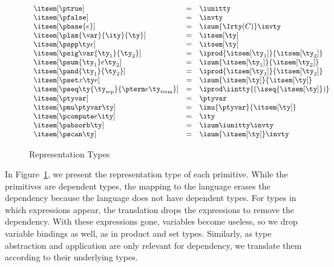 \begin{figure}
\fbox{$\itsem[\ty] = \ity$}
\[
\begin{array}{lcl} 
\itsem[\ptrue] & = & \iunitty \\
\itsem[\pfalse] & = & \invty \\
\itsem[\pbase{e}] & = & \isum {\Irty(C)} \invty   \\
\itsem[\plam{\var}{\ity}{\ty}] & = & \itsem[\ty] \\
\itsem[\papp \ty e] & = & \itsem[\ty] \\
\itsem[\psig \var {\ty_1} {\ty_2}]  & = & \iprod {\itsem[\ty_1]} {\itsem[\ty_2]}    \\
\itsem[\psum {\ty_1} e {\ty_2}]     & = & \isum {\itsem[\ty_1]} {\itsem[\ty_2]} \\
\itsem[\pand {\ty_1} {\ty_2}]  & = & \iprod {\itsem[\ty_1]}{\itsem[\ty_2]}\\
\itsem[\pset x \ty e] & = & \isum {\itsem[\ty]}{\itsem[\ty]}\\
\itsem[\pseq \ty {\ty_{\text{sep}}} {\pterm e {\ty_{\text{term}}}}] & = & 
    \iprod \iintty {(\iseq{\itsem[\ty]})}             \\
\itsem[\ptyvar] & = & \ptyvar \\
\itsem[\pmu \ptyvar \ty] & = & \imu{\ptyvar}{\itsem[\ty]} \\
\itsem[\pcompute e \ity]                 & = & \ity \\
\itsem[\pabsorb \ty]                     & = & \isum \iunitty \invty \\
\itsem[\pscan \ty] & = & \isum {\itsem[\ty]} \invty 
\end{array}
\]
\caption{Representation Types}
\label{fig:rep-tys}
\end{figure}

In Figure~\ref{fig:rep-tys}, we present the representation type
of each \ddc{} primitive. While the primitives are
dependent types, the mapping to the \implang{} language erases the dependency because the \implang{} language does not have dependent types. For \ddc{} types in which expressions appear,
the translation drops the expressions to remove the dependency.
With these expressions gone, variables become useless, so we drop 
variable bindings as well, as in product and set types.
Similarly, as type abstraction and application are only relevant for
dependency, we translate them according to their underlying types.

